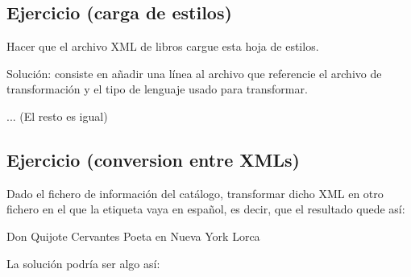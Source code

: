 \documentclass[letterpaper,10pt,spanish]{sphinxmanual}
\begin{document}
\subsection{Ejercicio (carga de estilos)}
\label{\detokenize{tema7:ejercicio-carga-de-estilos}}
Hacer que el archivo XML de libros cargue esta hoja de estilos.

Solución: consiste en añadir una línea al archivo que referencie el archivo de transformación y el tipo de lenguaje usado para transformar.

\begin{sphinxVerbatim}[commandchars=\\\{\}]

        ... (El resto es igual)
\end{sphinxVerbatim}


\subsection{Ejercicio (conversion entre XMLs)}
\label{\detokenize{tema7:ejercicio-conversion-entre-xmls}}
Dado el fichero de información del catálogo, transformar dicho XML en otro fichero en el que la etiqueta  vaya en español, es decir, que el resultado quede así:

\begin{sphinxVerbatim}[commandchars=\\\{\}]
    Don Quijote
    Cervantes
    Poeta en Nueva York
    Lorca
\end{sphinxVerbatim}

La solución podría ser algo así:
\end{document}
